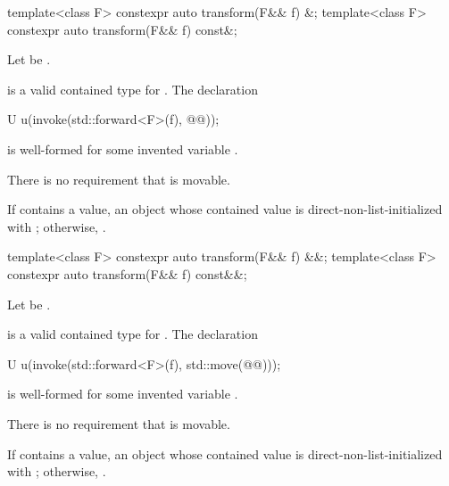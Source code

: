 %
\begin{itemdecl}
template<class F>
  constexpr auto transform(F&& f) &;
template<class F>
  constexpr auto transform(F&& f) const&;
\end{itemdecl}

\begin{itemdescr}
\pnum
Let  be .

\pnum
\mandates
{} is a valid contained type for . The declaration
\begin{codeblock}
U u(invoke(std::forward<F>(f), @@));
\end{codeblock}
is well-formed for some invented variable .
\begin{note}
There is no requirement that  is movable.
\end{note}

\pnum
\returns
If  contains a value, an  object whose contained value is direct-non-list-initialized with ; otherwise, .
\end{itemdescr}

%
\begin{itemdecl}
template<class F>
  constexpr auto transform(F&& f) &&;
template<class F>
  constexpr auto transform(F&& f) const&&;
\end{itemdecl}

\begin{itemdescr}
\pnum
Let  be .

\pnum
\mandates
{} is a valid contained type for . The declaration
\begin{codeblock}
U u(invoke(std::forward<F>(f), std::move(@@)));
\end{codeblock}
is well-formed for some invented variable .
\begin{note}
There is no requirement that  is movable.
\end{note}

\pnum
\returns
If  contains a value, an  object whose contained value is direct-non-list-initialized with ; otherwise, .
\end{itemdescr}

